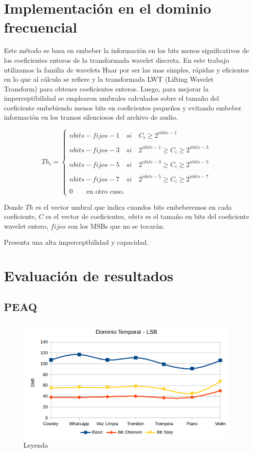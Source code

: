 \documentclass[conference,a4paper,10pt, oneside,final]{tfmpd}
\begin{document}
\section{Implementación en el dominio frecuencial}
Este método se basa en embeber la información en los bits menos significativos de los coeficientes enteros de la transformada wavelet discreta. 
En este trabajo utilizamos la familia de wavelets Haar por ser las mas simples, rápidas y eficientes en lo que al cálculo se refiere y la transformada LWT (Lifting Wavelet Transform) para obtener coeficientes enteros. Luego, para mejorar la imperceptibilidad se emplearon umbrales calculados sobre el tamaño del coeficiente embebiendo menos bits en coeficientes pequeños y evitando embeber información en los tramos silenciosos del archivo de audio.

\scriptsize{
$$
Th_i= \left\lbrace 
\begin{array}{ll}
 nbits - fijos -1 \quad si \quad C_i \geq 2^{nbits-1}\\
 \\
nbits - fijos -3 \quad si \quad 2^{nbits-1} \geq C_i \geq 2^{nbits-3} \\
\\
nbits - fijos -5 \quad si \quad 2^{nbits-3} \geq C_i \geq 2^{nbits-5} \\
\\
nbits - fijos -7 \quad si \quad 2^{nbits-5} \geq C_i \geq 2^{nbits-7} \\
\\
0 \qquad  \text{en otro caso.} 
\end{array}
\right.
$$
}

Donde $Th$ es el vector umbral que indica cuandos bits embeberemos en cada coeficiente, $C$ es el vector de coeficientes, $nbits$ es el tamaño en bits del coeficiente wavelet entero, $fijos$ son los MSBs que no se tocarán.

Presenta una alta imperceptbilidad y capacidad.

\section{Evaluación de resultados}
\subsection{PEAQ}
\begin{figure}[h!]
 \centering
 \includegraphics[keepaspectratio=true, width=240 px]{./graficos/dominio-temporal-lsb-snr.png}
 \caption{Leyenda}
 \label{fig: etiqueta}
\end{figure}
\end{document}
